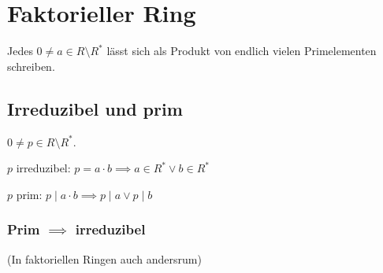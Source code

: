 \section*{Faktorieller Ring}
Jedes $0 \neq a \in R \setminus R^*$ lässt sich als Produkt von endlich vielen Primelementen schreiben.

\subsection*{Irreduzibel und prim}
$0 \neq p \in R \setminus R^*$.

$p$ irreduzibel: $p = a \cdot b \implies a \in R^* \lor b \in R^*$

$p$ prim: $p \mid a \cdot b \implies p \mid a \lor p \mid b$

\subsubsection*{Prim $\implies$ irreduzibel}
(In faktoriellen Ringen auch andersrum)
